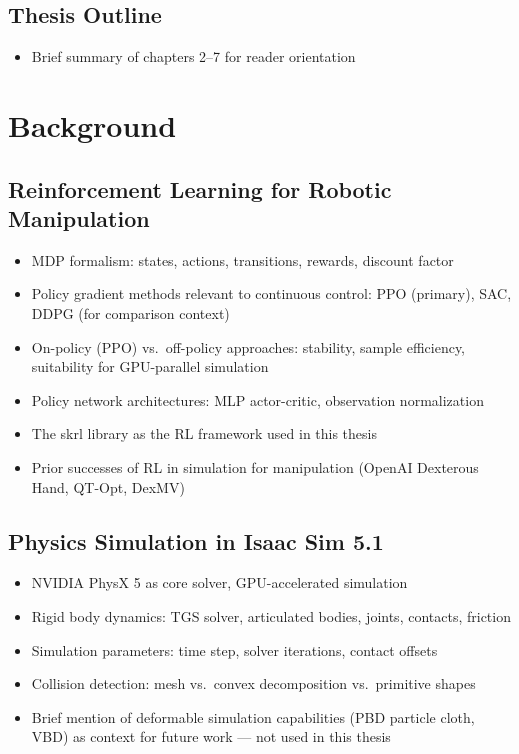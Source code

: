 \section{Thesis Outline}
\begin{itemize}
    \item Brief summary of chapters 2--7 for reader orientation
\end{itemize}

\chapter{Background}\label{ch:background}

\section{Reinforcement Learning for Robotic Manipulation}
\begin{itemize}
    \item MDP formalism: states, actions, transitions, rewards, discount factor
    \item Policy gradient methods relevant to continuous control: PPO (primary), SAC, DDPG (for comparison context)
    \item On-policy (PPO) vs.\ off-policy approaches: stability, sample efficiency, suitability for GPU-parallel simulation
    \item Policy network architectures: MLP actor-critic, observation normalization
    \item The skrl library as the RL framework used in this thesis
    \item Prior successes of RL in simulation for manipulation (OpenAI Dexterous Hand, QT-Opt, DexMV)
\end{itemize}

\section{Physics Simulation in Isaac Sim 5.1}
\begin{itemize}
    \item NVIDIA PhysX 5 as core solver, GPU-accelerated simulation
    \item Rigid body dynamics: TGS solver, articulated bodies, joints, contacts, friction
    \item Simulation parameters: time step, solver iterations, contact offsets
    \item Collision detection: mesh vs.\ convex decomposition vs.\ primitive shapes
    \item Brief mention of deformable simulation capabilities (PBD particle cloth, VBD) as context for future work --- not used in this thesis
\end{itemize}

